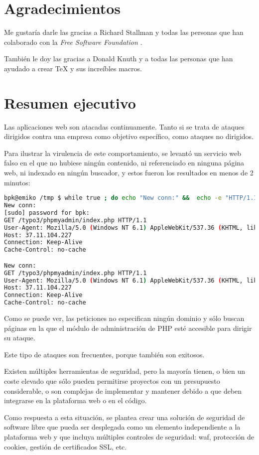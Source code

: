 \clearpage
\section*{Agradecimientos}
\par Me gustaría darle las gracias a Richard Stallman \cite{stallman} y todas las personas que han colaborado con la {\em Free Software Foundation} \cite{fsf}.
\par También le doy las gracias a Donald Knuth \cite{knuth} y a todas las personas que han ayudado a crear TeX \cite{tex} y sus increíbles macros.


\section*{Resumen ejecutivo}
\par Las aplicaciones web son atacadas continuamente. Tanto si se trata de ataques dirigidos contra una empresa como objetivo específico, como ataques no dirigidos.
\par Para ilustrar la virulencia de este comportamiento, se levantó un servicio web falso en el que no hubiese ningún contenido, ni referenciado en ninguna página web, ni indexado en ningún buscador, y estos fueron los resultados en menos de 2
minutos: \\
\begin{minipage}{\linewidth}
\begin{lstlisting}[language=bash,basicstyle=\scriptsize]
bpk@emiko /tmp $ while true ; do echo "New conn:" &&  echo -e "HTTP/1.1 200 OK\n\n $(date)" | sudo nc -l -p 80  ; done
New conn:
[sudo] password for bpk:
GET /typo3/phpmyadmin/index.php HTTP/1.1
User-Agent: Mozilla/5.0 (Windows NT 6.1) AppleWebKit/537.36 (KHTML, like Gecko) Chrome/61.0.3163.91 Safari/537.36
Host: 37.11.104.227
Connection: Keep-Alive
Cache-Control: no-cache

New conn:
GET /typo3/phpmyadmin/index.php HTTP/1.1
User-Agent: Mozilla/5.0 (Windows NT 6.1) AppleWebKit/537.36 (KHTML, like Gecko) Chrome/61.0.3163.91 Safari/537.36
Host: 37.11.104.227
Connection: Keep-Alive
Cache-Control: no-cache
\end{lstlisting}
\end{minipage}
\par Como se puede ver, las peticiones no especifican ningún dominio y sólo buscan páginas en la que el módulo de administración de PHP esté accesible para dirigir su ataque.
\par Este tipo de ataques son frecuentes, porque también son exitosos.
\par Existen múltiples herramientas de seguridad, pero la mayoría tienen, o bien un coste elevado que sólo pueden permitirse proyectos con un presupuesto considerable, o son complejas de implementar y mantener debido a que deben integrarse en la plataforma web o en el código.

\par Como respuesta a esta situación, se plantea crear una solución de seguridad de software libre que pueda ser desplegada como un elemento independiente a la plataforma web y que incluya múltiples controles de seguridad: \acrlong{waf}, protección de cookies, gestión de certificados SSL, etc.

